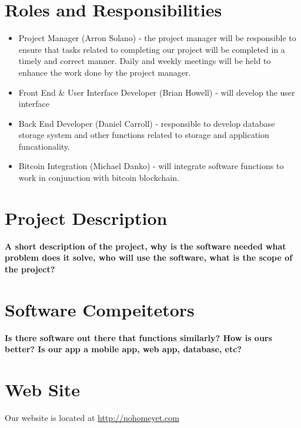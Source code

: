 \documentclass[12pt]{article}
\begin{document}
  

  \tableofcontents
  \listoffigures

  \clearpage

  \setcounter{page}{1}

  \section{Roles and Responsibilities}
  \begin{adjustwidth}{1.5em}{0pt}
    \begin{itemize}
      \item Project Manager (Arron Solano) - the project manager will be responsible to ensure that tasks related to completing our project will be completed in a timely and correct manner. Daily and weekly meetings will be held to enhance the work done by the project manager.
      \item Front End \& User Interface Developer (Brian Howell) - will develop the user interface 
      \item Back End Developer (Daniel Carroll) - responsible to develop database storage system and other functions related to storage and application funcationality.
       \item Bitcoin Integration (Michael Danko) - will integrate software functions to work in conjunction with bitcoin blockchain.
    \end{itemize}
    
\end{adjustwidth}

  \section{Project Description}
  \begin{adjustwidth}{1.5em}{0pt}

  \normalsize{\textbf{A short description of the project, why is the software needed what problem does it solve, who will use the software, what is the scope of the project?}}\\ 

  \end{adjustwidth}

  \section{Software Compeitetors}

  \normalsize{\textbf{Is there software out there that functions similarly? How is ours better? Is our app a mobile app, web app, database, etc?}}\\ 


  \section{Web Site}
  Our website is located at \url{http://nohomeyet.com}
\end{document}
